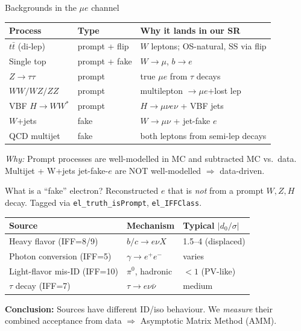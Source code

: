 \documentclass[10pt,aspectratio=169]{beamer}
\newcommand{\motiv}[1]{%
  \begin{tcolorbox}[colback=motivbg,colframe=motivbord,arc=1.5mm,boxrule=0.5pt,
                    left=1mm,right=1mm,top=0.5mm,bottom=0.5mm]
  \footnotesize\textit{Why:} #1
  \end{tcolorbox}}
\newcommand{\concl}[1]{%
  \begin{tcolorbox}[colback=conclbg,colframe=conclbord,arc=1.5mm,boxrule=0.6pt,
                    left=1mm,right=1mm,top=0.5mm,bottom=0.5mm]
  \footnotesize\textbf{Conclusion:} #1
  \end{tcolorbox}}
\newcommand{\fname}[1]{\texttt{\tiny #1}}
\begin{document}
\begin{frame}{Backgrounds in the $\mu e$ channel}
  \footnotesize
  \begin{tabular}{lll}
    \toprule
    Process & Type & Why it lands in our SR \\
    \midrule
    $t\bar t$ (di-lep)   & prompt + flip & $W$ leptons; OS-natural, SS via flip \\
    Single top           & prompt + fake & $W\!\to\!\mu$, $b\!\to\!e$ \\
    $Z\!\to\!\tau\tau$   & prompt        & true $\mu e$ from $\tau$ decays \\
    $WW/WZ/ZZ$           & prompt        & multilepton $\to \mu e$+lost lep \\
    VBF $H\!\to\!WW^\ast$& prompt        & $H\!\to\!\mu\nu e\nu$ + VBF jets \\
    $W$+jets             & fake          & $W\!\to\!\mu\nu$ + jet-fake $e$ \\
    QCD multijet         & fake          & both leptons from semi-lep decays \\
    \bottomrule
  \end{tabular}
  \motiv{Prompt processes are well-modelled in MC and subtracted MC vs.\ data.
  Multijet + W+jets jet-fake-$e$ are NOT well-modelled $\Rightarrow$ data-driven.}
\end{frame}

\begin{frame}{What is a ``fake'' electron?}
  \footnotesize
  Reconstructed $e$ that is \emph{not} from a prompt $W,Z,H$ decay.
  Tagged via \fname{el\_truth\_isPrompt}, \fname{el\_IFFClass}.

  \vspace{1mm}
  \begin{tabular}{lll}
    \toprule
    Source & Mechanism & Typical $|d_0/\sigma|$ \\
    \midrule
    Heavy flavor (IFF=8/9) & $b/c\!\to\!e\nu X$ & 1.5--4 (displaced) \\
    Photon conversion (IFF=5) & $\gamma\!\to\!e^+e^-$ & varies \\
    Light-flavor mis-ID (IFF=10) & $\pi^0$, hadronic & $<1$ (PV-like) \\
    $\tau$ decay (IFF=7) & $\tau\!\to\!e\nu\bar\nu$ & medium \\
    \bottomrule
  \end{tabular}
  \concl{Sources have different ID/iso behaviour. We \emph{measure} their
  combined acceptance from data $\Rightarrow$ Asymptotic Matrix Method (AMM).}
\end{frame}
\end{document}

